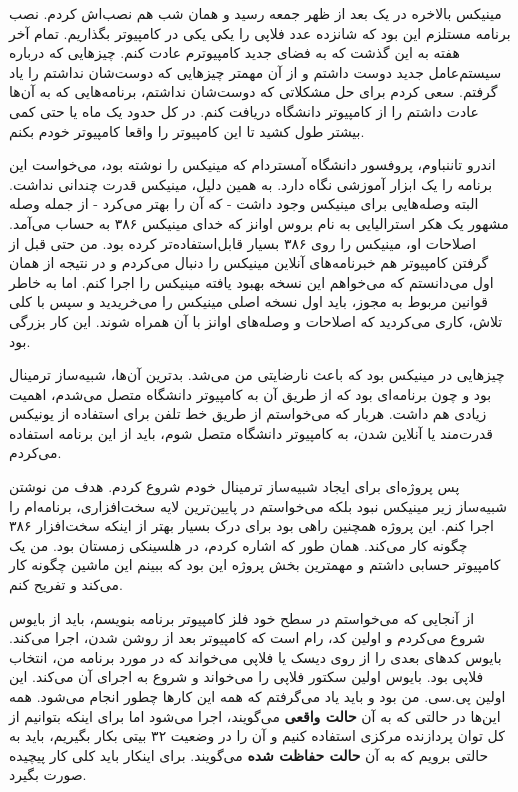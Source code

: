 مینیکس بالاخره در یک بعد از ظهر جمعه رسید و همان شب هم نصب‌اش کردم. نصب
برنامه مستلزم این بود که شانزده عدد فلاپی را یکی یکی در کامپیوتر
بگذاریم. تمام آخر هفته به این گذشت که به فضای جدید کامپیوترم عادت
کنم. چیزهایی که درباره سیستم‌عامل جدید دوست داشتم و از آن مهمتر چیزهایی
که دوست‌شان نداشتم را یاد گرفتم. سعی کردم برای حل مشکلاتی که دوست‌شان
نداشتم، برنامه‌هایی که به آن‌ها عادت داشتم را از کامپیوتر دانشگاه دریافت
کنم. در کل حدود یک ماه یا حتی کمی بیشتر طول کشید تا این کامپیوتر را
واقعا کامپیوتر خودم بکنم.

اندرو تاننباوم، پروفسور دانشگاه آمستردام که مینیکس را نوشته بود،
می‌خواست این برنامه را یک ابزار آموزشی نگاه دارد. به همین دلیل، مینیکس
قدرت چندانی نداشت. البته وصله‌هایی برای مینیکس وجود داشت - که آن را بهتر
می‌کرد - از جمله وصله مشهور یک هکر استرالیایی به نام بروس
اوانز که خدای مینیکس ۳۸۶ به حساب می‌آمد. اصلاحات
او، مینیکس را روی ۳۸۶ بسیار قابل‌استفاده‌تر کرده بود. من حتی قبل از گرفتن
کامپیوتر هم خبرنامه‌های آنلاین مینیکس را دنبال می‌کردم و در نتیجه از
همان اول می‌دانستم که می‌خواهم این نسخه بهبود یافته مینیکس را اجرا
کنم. اما به خاطر قوانین مربوط به مجوز، باید اول نسخه اصلی مینیکس را
می‌خریدید و سپس با کلی تلاش، کاری می‌کردید که اصلاحات و وصله‌های اوانز با
آن همراه شوند. این کار بزرگی بود.

چیزهایی در مینیکس بود که باعث نارضایتی من می‌شد. بدترین آن‌ها، شبیه‌ساز
ترمینال بود و چون برنامه‌ای بود که از طریق آن به کامپیوتر دانشگاه متصل
می‌شدم، اهمیت زیادی هم داشت. هربار که می‌خواستم از طریق خط تلفن برای
استفاده از یونیکس قدرت‌مند یا آنلاین شدن، به کامپیوتر دانشگاه متصل شوم،
باید از این برنامه استفاده می‌کردم.

پس پروژه‌ای برای ایجاد شبیه‌ساز ترمینال خودم شروع کردم. هدف من نوشتن
شبیه‌ساز زیر مینیکس نبود بلکه می‌خواستم در پایین‌ترین‌ لایه سخت‌افزاری،
برنامه‌ام را اجرا کنم. این پروژه همچنین راهی بود برای درک بسیار بهتر از
اینکه سخت‌افزار ۳۸۶ چگونه کار می‌کند. همان طور که اشاره کردم، در هلسینکی
زمستان بود. من یک کامپیوتر حسابی داشتم و مهمترین بخش پروژه این بود که
ببینم این ماشین چگونه کار می‌کند و تفریح کنم.

از آنجایی که می‌خواستم در سطح خود فلز کامپیوتر برنامه بنویسم، باید از
بایوس شروع می‌کردم و
اولین کد، رام است که کامپیوتر بعد از روشن شدن، اجرا
می‌کند. بایوس کدهای بعدی را از روی دیسک یا فلاپی می‌خواند که در مورد
برنامه من، انتخاب فلاپی بود. بایوس اولین سکتور فلاپی را می‌خواند و شروع
به اجرای آن می‌کند. این اولین پی.سی. من بود و باید یاد می‌گرفتم که همه
این کارها چطور انجام می‌شود. همه این‌ها در حالتی که به آن \textbf{حالت
  واقعی} می‌گویند، اجرا می‌شود اما برای اینکه
بتوانیم از کل توان پردازنده مرکزی استفاده کنیم و آن را در وضعیت ۳۲
بیتی بکار بگیریم، باید به حالتی برویم که به آن \textbf{حالت حفاظت
  شده} می‌گویند. برای اینکار باید کلی کار
پیچیده صورت بگیرد.

